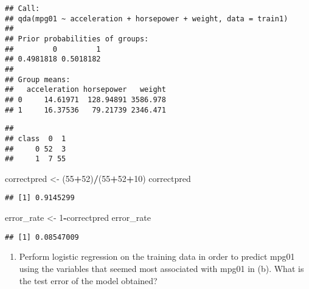 \documentclass[]{article}
\newenvironment{Shaded}{\begin{snugshade}}{\end{snugshade}}
\newcommand{\KeywordTok}[1]{\textcolor[rgb]{0.13,0.29,0.53}{\textbf{#1}}}
\newcommand{\DataTypeTok}[1]{\textcolor[rgb]{0.13,0.29,0.53}{#1}}
\newcommand{\DecValTok}[1]{\textcolor[rgb]{0.00,0.00,0.81}{#1}}
\newcommand{\StringTok}[1]{\textcolor[rgb]{0.31,0.60,0.02}{#1}}
\newcommand{\CommentTok}[1]{\textcolor[rgb]{0.56,0.35,0.01}{\textit{#1}}}
\newcommand{\OperatorTok}[1]{\textcolor[rgb]{0.81,0.36,0.00}{\textbf{#1}}}
\newcommand{\NormalTok}[1]{#1}
\providecommand{\tightlist}{%
  \setlength{\itemsep}{0pt}\setlength{\parskip}{0pt}}
\begin{document}
\begin{verbatim}
## Call:
## qda(mpg01 ~ acceleration + horsepower + weight, data = train1)
## 
## Prior probabilities of groups:
##         0         1 
## 0.4981818 0.5018182 
## 
## Group means:
##   acceleration horsepower   weight
## 0     14.61971  128.94891 3586.978
## 1     16.37536   79.21739 2346.471
\end{verbatim}

\begin{Shaded}
\end{Shaded}

\begin{verbatim}
##      
## class  0  1
##     0 52  3
##     1  7 55
\end{verbatim}

\begin{Shaded}
\begin{Highlighting}[]
\NormalTok{correctpred <-}\StringTok{ }\NormalTok{(}\DecValTok{55}\OperatorTok{+}\DecValTok{52}\NormalTok{)}\OperatorTok{/}\NormalTok{(}\DecValTok{55}\OperatorTok{+}\DecValTok{52}\OperatorTok{+}\DecValTok{10}\NormalTok{)}
\NormalTok{correctpred}
\end{Highlighting}
\end{Shaded}

\begin{verbatim}
## [1] 0.9145299
\end{verbatim}

\begin{Shaded}
\begin{Highlighting}[]
\NormalTok{error_rate <-}\StringTok{ }\DecValTok{1}\OperatorTok{-}\NormalTok{correctpred}
\NormalTok{error_rate}
\end{Highlighting}
\end{Shaded}

\begin{verbatim}
## [1] 0.08547009
\end{verbatim}

\begin{enumerate}
\def\labelenumi{(\alph{enumi})}
\setcounter{enumi}{5}
\tightlist
\item
  Perform logistic regression on the training data in order to predict
  mpg01 using the variables that seemed most associated with mpg01 in
  (b). What is the test error of the model obtained?
\end{enumerate}
\end{document}
